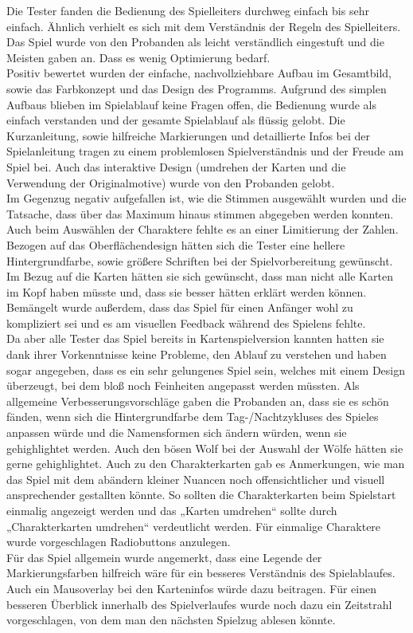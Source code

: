 Die Tester fanden die Bedienung des Spielleiters durchweg einfach bis
sehr einfach. Ähnlich verhielt es sich mit dem Verständnis der Regeln
des Spielleiters. Das Spiel wurde von den Probanden als leicht
verständlich eingestuft und die Meisten gaben an. Dass es wenig
Optimierung bedarf. \\
Positiv bewertet wurden der einfache, nachvollziehbare Aufbau im
Gesamtbild, sowie das Farbkonzept und das Design des Programms. Aufgrund
des simplen Aufbaus blieben im Spielablauf keine Fragen offen, die
Bedienung wurde als einfach verstanden und der gesamte Spielablauf als
flüssig gelobt. Die Kurzanleitung, sowie hilfreiche Markierungen und
detaillierte Infos bei der Spielanleitung tragen zu einem problemlosen
Spielverständnis und der Freude am Spiel bei. Auch das interaktive
Design (umdrehen der Karten und die Verwendung der Originalmotive) wurde
von den Probanden gelobt. \\
Im Gegenzug negativ aufgefallen ist, wie die Stimmen ausgewählt wurden
und die Tatsache, dass über das Maximum hinaus stimmen abgegeben werden
konnten. Auch beim Auswählen der Charaktere fehlte es an einer
Limitierung der Zahlen. \\
Bezogen auf das Oberflächendesign hätten sich die Tester eine hellere
Hintergrundfarbe, sowie größere Schriften bei der Spielvorbereitung
gewünscht. Im Bezug auf die Karten hätten sie sich gewünscht, dass man
nicht alle Karten im Kopf haben müsste und, dass sie besser hätten
erklärt werden können. Bemängelt wurde außerdem, dass das Spiel für
einen Anfänger wohl zu kompliziert sei und es am visuellen Feedback
während des Spielens fehlte. \\ 
Da aber alle Tester das Spiel bereits in Kartenspielversion kannten
hatten sie dank ihrer Vorkenntnisse keine Probleme, den Ablauf zu
verstehen und haben sogar angegeben, dass es ein sehr gelungenes Spiel
sein, welches mit einem Design überzeugt, bei dem bloß noch Feinheiten
angepasst werden müssten. \newpage
Als allgemeine Verbesserungsvorschläge gaben die Probanden an, dass sie
es schön fänden, wenn sich die Hintergrundfarbe dem Tag-/Nachtzykluses
des Spieles anpassen würde und die Namensformen sich ändern würden, wenn
sie gehighlightet werden. Auch den bösen Wolf bei der Auswahl der Wölfe
hätten sie gerne gehighlightet. Auch zu den Charakterkarten gab es
Anmerkungen, wie man das Spiel mit dem abändern kleiner Nuancen noch
offensichtlicher und visuell ansprechender gestallten könnte. So sollten
die Charakterkarten beim Spielstart einmalig angezeigt werden und das
„Karten umdrehen“ sollte durch „Charakterkarten umdrehen“ verdeutlicht
werden. Für einmalige Charaktere wurde vorgeschlagen Radiobuttons
anzulegen. \\
Für das Spiel allgemein wurde angemerkt, dass eine Legende der
Markierungsfarben hilfreich wäre für ein besseres Verständnis des
Spielablaufes. Auch ein Mausoverlay bei den Karteninfos würde dazu
beitragen. Für einen besseren Überblick innerhalb des Spielverlaufes
wurde noch dazu ein Zeitstrahl vorgeschlagen, von dem man den nächsten
Spielzug ablesen könnte.



